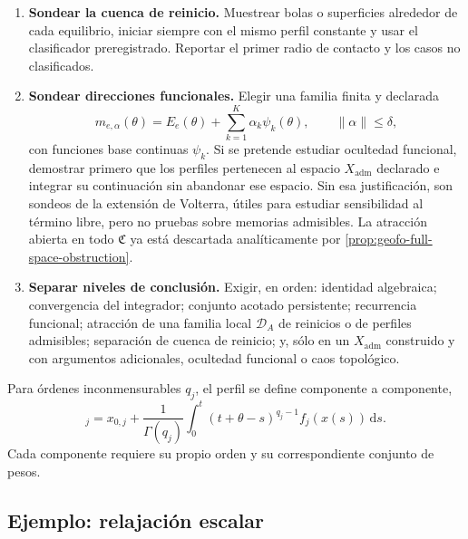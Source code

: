 \begin{enumerate}[label=\textbf{C\arabic*.}]
 \item \textbf{Sondear la cuenca de reinicio.} Muestrear bolas o superficies
 alrededor de cada equilibrio, iniciar siempre con el mismo perfil constante y
 usar el clasificador preregistrado. Reportar el primer radio de contacto y los
 casos no clasificados.

 \item \textbf{Sondear direcciones funcionales.} Elegir una familia finita y
 declarada
 \begin{equation}
  m_{e,\alpha}(\theta)=E_e(\theta)+
  \sum_{k=1}^{K}\alpha_k\psi_k(\theta),
  \qquad \|\alpha\|\leq\delta,
  \label{eq:geofo-history-probes}
 \end{equation}
 con funciones base continuas \(\psi_k\). Si se pretende estudiar ocultedad
 funcional, demostrar primero que los perfiles pertenecen al espacio
 \(X_{\mathrm{adm}}\) declarado e integrar su continuación sin abandonar
 ese espacio. Sin esa justificación, son sondeos de la extensión de Volterra,
 útiles para estudiar sensibilidad al término libre, pero no pruebas sobre
 memorias admisibles. La atracción abierta en todo \(\mathfrak C\) ya está
 descartada analíticamente por \cref{prop:geofo-full-space-obstruction}.

 \item \textbf{Separar niveles de conclusión.} Exigir, en orden: identidad
 algebraica; convergencia del integrador; conjunto acotado persistente;
 recurrencia funcional; atracción de una familia local \(\mathcal D_A\)
 de reinicios o de perfiles admisibles; separación de cuenca de reinicio; y,
 sólo en un \(X_{\mathrm{adm}}\) construido y con argumentos adicionales,
 ocultedad funcional o caos topológico.
\end{enumerate}

Para órdenes inconmensurables \(q_j\), el perfil se define componente a
componente,
\begin{equation}
 [m_t(\theta)]_j=x_{0,j}+\frac1{\Gamma(q_j)}
 \int_0^t(t+\theta-s)^{q_j-1}f_j(x(s))\,\mathrm ds.
 \label{eq:geofo-incommensurate-profile}
\end{equation}
Cada componente requiere su propio orden y su correspondiente conjunto de
pesos.

\subsection{Ejemplo: relajación escalar}

